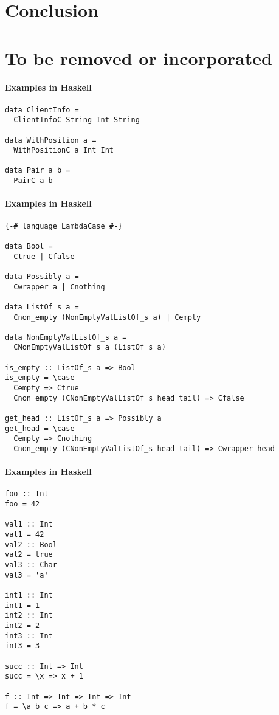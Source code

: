 \documentclass{article}
\def\H{Haskell}
\begin{document}
\section{Conclusion}

\section{To be removed or incorporated}

\paragraph{Examples in \H}

\begin{verbatim}
data ClientInfo =
  ClientInfoC String Int String

data WithPosition a = 
  WithPositionC a Int Int

data Pair a b = 
  PairC a b
\end{verbatim}

\paragraph{Examples in \H}

\begin{verbatim}
{-# language LambdaCase #-}

data Bool =
  Ctrue | Cfalse

data Possibly a =
  Cwrapper a | Cnothing

data ListOf_s a =
  Cnon_empty (NonEmptyValListOf_s a) | Cempty

data NonEmptyValListOf_s a =
  CNonEmptyValListOf_s a (ListOf_s a)

is_empty :: ListOf_s a => Bool
is_empty = \case
  Cempty => Ctrue
  Cnon_empty (CNonEmptyValListOf_s head tail) => Cfalse

get_head :: ListOf_s a => Possibly a
get_head = \case
  Cempty => Cnothing
  Cnon_empty (CNonEmptyValListOf_s head tail) => Cwrapper head
\end{verbatim}

\paragraph{Examples in \H}
\begin{verbatim}
foo :: Int
foo = 42

val1 :: Int
val1 = 42
val2 :: Bool
val2 = true
val3 :: Char
val3 = 'a'

int1 :: Int
int1 = 1
int2 :: Int
int2 = 2
int3 :: Int
int3 = 3

succ :: Int => Int
succ = \x => x + 1

f :: Int => Int => Int => Int
f = \a b c => a + b * c
\end{verbatim}
\end{document}
